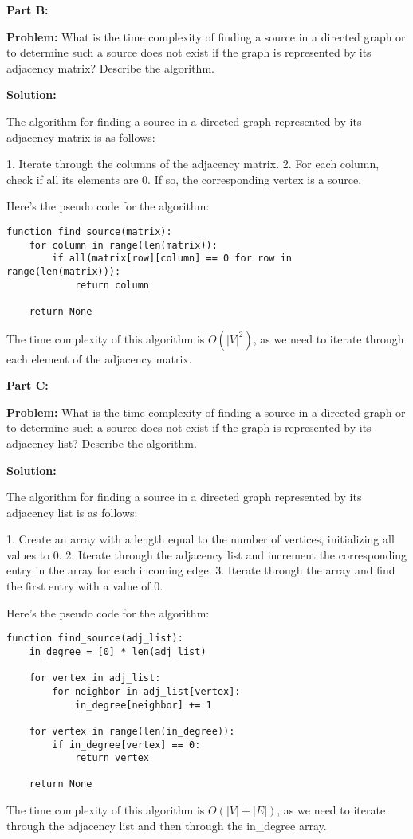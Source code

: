 \documentclass[11pt]{article}
\begin{document}
\textbf{Part B:}

\textbf{Problem:} What is the time complexity of finding a source in a directed graph or to determine such a source does not exist if the graph is represented by its adjacency matrix? Describe the algorithm.

\textbf{Solution:}

The algorithm for finding a source in a directed graph represented by its adjacency matrix is as follows:

1. Iterate through the columns of the adjacency matrix.
2. For each column, check if all its elements are 0. If so, the corresponding vertex is a source.

Here's the pseudo code for the algorithm:

\begin{verbatim}
function find_source(matrix):
    for column in range(len(matrix)):
        if all(matrix[row][column] == 0 for row in range(len(matrix))):
            return column

    return None
\end{verbatim}

The time complexity of this algorithm is $O(|V|^2)$, as we need to iterate through each element of the adjacency matrix.

\textbf{Part C:}

\textbf{Problem:} What is the time complexity of finding a source in a directed graph or to determine such a source does not exist if the graph is represented by its adjacency list? Describe the algorithm.

\textbf{Solution:}

The algorithm for finding a source in a directed graph represented by its adjacency list is as follows:

1. Create an array with a length equal to the number of vertices, initializing all values to 0.
2. Iterate through the adjacency list and increment the corresponding entry in the array for each incoming edge.
3. Iterate through the array and find the first entry with a value of 0.

Here's the pseudo code for the algorithm:

\begin{verbatim}
function find_source(adj_list):
    in_degree = [0] * len(adj_list)

    for vertex in adj_list:
        for neighbor in adj_list[vertex]:
            in_degree[neighbor] += 1

    for vertex in range(len(in_degree)):
        if in_degree[vertex] == 0:
            return vertex

    return None
\end{verbatim}

The time complexity of this algorithm is $O(|V| + |E|)$, as we need to iterate through the adjacency list and then through the in_degree array.
\end{document}
